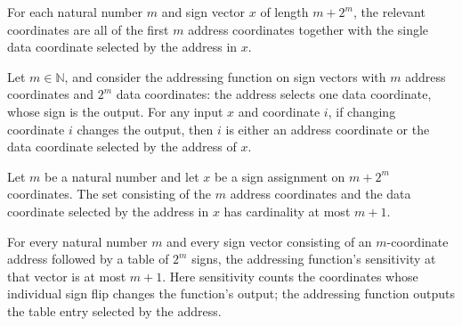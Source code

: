 \begin{definition}
\label{FABL.addressingRelevantCoordinates}
\leanok
{}
For each natural number $m$ and sign vector $x$ of length $m+2^m$, the relevant
coordinates are all of the first $m$ address coordinates together with the single data
coordinate selected by the address in $x$.
\end{definition}

\begin{theorem}
\label{FABL.isPivotal_addressingFunction_mem_relevant}
\leanok
{}
Let $m\in\mathbb N$, and consider the addressing function on sign vectors with $m$
address coordinates and $2^m$ data coordinates: the address selects one data coordinate,
whose sign is the output. For any input $x$ and coordinate $i$, if changing coordinate
$i$ changes the output, then $i$ is either an address coordinate or the data coordinate
selected by the address of $x$.
\end{theorem}

\begin{theorem}
\label{FABL.card_addressingRelevantCoordinates_le}
\leanok
{}
Let $m$ be a natural number and let $x$ be a sign assignment on $m+2^m$ coordinates. The
set consisting of the $m$ address coordinates and the data coordinate selected by the
address in $x$ has cardinality at most $m+1$.
\end{theorem}

\begin{theorem}
\label{FABL.sensitivity_addressingFunction_le}
\leanok
{}
For every natural number $m$ and every sign vector consisting of an $m$-coordinate
address followed by a table of $2^m$ signs, the addressing function's sensitivity at
that vector is at most $m+1$. Here sensitivity counts the coordinates whose individual
sign flip changes the function's output; the addressing function outputs the table entry
selected by the address.
\end{theorem}

